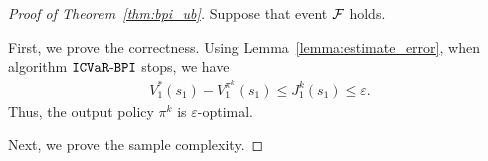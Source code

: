 \begin{proof}[Proof of Theorem~\ref{thm:bpi_ub}]
	Suppose that event $\mathcal{F}$ holds.
	
	First, we prove the correctness.
	Using Lemma~\ref{lemma:estimate_error}, when algorithm $\mathtt{ICVaR\mbox{-}BPI}$ stops, we have
	\begin{align*}
		V^{*}_1(s_1)-V^{\pi^k}_1(s_1) \leq J^k_1(s_1) \leq \varepsilon .
	\end{align*}
	Thus, the output policy $\pi^k$ is $\varepsilon$-optimal.
	
	Next, we prove the sample complexity.
	
	
	
	

\end{proof}
